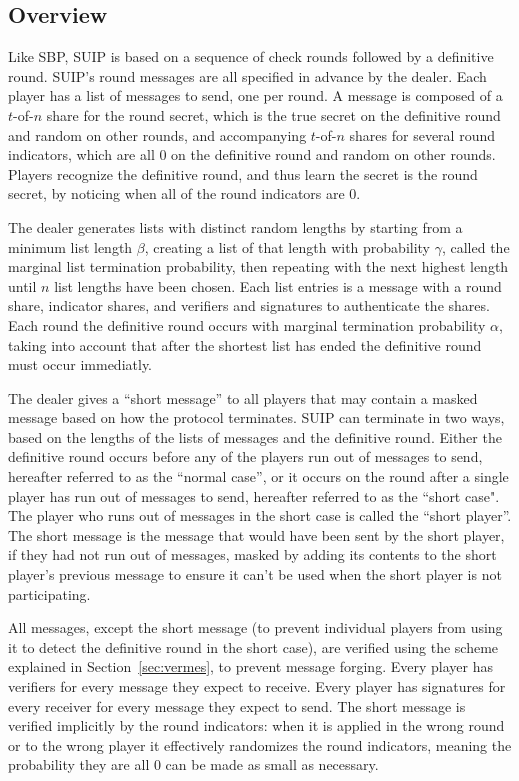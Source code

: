\documentclass{dalcsthesis}
\begin{document}
\subsection{Overview}

Like SBP, SUIP is based on a sequence of check rounds followed by a definitive round. SUIP's round messages are all specified in advance by the dealer. Each player has a list of messages to send, one per round. A message is composed of a $t$-of-$n$ share for the round secret, which is the true secret on the definitive round and random on other rounds, and accompanying $t$-of-$n$ shares for several round indicators, which are all 0 on the definitive round and random on other rounds. Players recognize the definitive round, and thus learn the secret is the round secret, by noticing when all of the round indicators are 0.

The dealer generates lists with distinct random lengths by starting from a minimum list length $\beta$, creating a list of that length with probability $\gamma$, called the marginal list termination probability, then repeating with the next highest length until $n$ list lengths have been chosen. Each list entries is a message with a round share, indicator shares, and verifiers and signatures to authenticate the shares. Each round the definitive round occurs with marginal termination probability $\alpha$, taking into account that after the shortest list has ended the definitive round must occur immediatly.

The dealer gives a ``short message'' to all players that may contain a masked message based on how the protocol terminates. SUIP can terminate in two ways, based on the lengths of the lists of messages and the definitive round. Either the definitive round occurs before any of the players run out of messages to send, hereafter referred to as the ``normal case'', or it occurs on the round after a single player has run out of messages to send, hereafter referred to as the ``short case". The player who runs out of messages in the short case is called the ``short player''. The short message is the message that would have been sent by the short player, if they had not run out of messages, masked by adding its contents to the short player's previous message to ensure it can't be used when the short player is not participating.

All messages, except the short message (to prevent individual players from using it to detect the definitive round in the short case), are verified using the scheme explained in Section~\ref{sec:vermes}, to prevent message forging. Every player has verifiers for every message they expect to receive. Every player has signatures for every receiver for every message they expect to send. The short message is verified implicitly by the round indicators: when it is applied in the wrong round or to the wrong player it effectively randomizes the round indicators, meaning the probability they are all 0 can be made as small as necessary.
\end{document}
